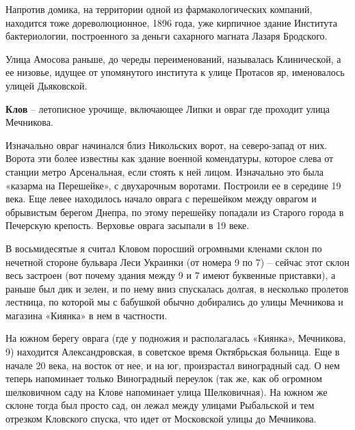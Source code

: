 Напротив домика, на территории одной из фармакологических компаний, находится тоже дореволюционное, 1896 года, уже кирпичное здание Института бактериологии, построенного за деньги сахарного магната Лазаря Бродского.

Улица Амосова раньше, до череды переименований, называлась Клинической, а ее низовье, идущее от упомянутого института к улице Протасов яр, именовалось улицей Дьяковской.\\

\medskip

\textbf{Клов} – летописное урочище, включающее Липки и овраг где проходит улица Мечникова. 

Изначально овраг начинался близ Никольских ворот, на северо-запад от них. Ворота эти более известны как здание военной комендатуры, которое слева от станции метро Арсенальная, если стоять к ней лицом. Изначально это была «казарма на Перешейке», с двухарочным воротами. Построили ее в середине 19 века. Еще левее находилось начало оврага с перешейком между оврагом и обрывистым берегом Днепра, по этому перешейку попадали из Старого города в Печерскую крепость. Верховье оврага засыпали в 19 веке.


В восьмидесятые я считал Кловом поросший огромными кленами склон по нечетной стороне бульвара Леси Украинки (от номера 9 по 7) – сейчас этот склон весь застроен (вот почему здания между 9 и 7 имеют буквенные приставки), а раньше был дик и зелен, и по нему вниз спускалась долгая, в несколько пролетов лестница, по которой мы с бабушкой обычно добирались до улицы Мечникова и магазина «Киянка» в нем в частности.

На южном берегу оврага (где у подножия и располагалась «Киянка», Мечникова, 9) находится Александровская, в советское время Октябрьская больница. Еще в начале 20 века, на восток от нее, и на юг, произрастал виноградный сад. О нем теперь напоминает только Виноградный переулок (так же, как об огромном шелковичном саду на Клове напоминает улица Шелковичная). На южном же склоне тогда был просто сад, он лежал между улицами Рыбальской и тем отрезком Кловского спуска, что идет от Московской улицы до Мечникова.

